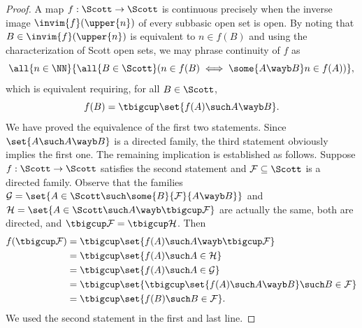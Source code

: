 \begin{proof}
  A map $f : \Scott \to \Scott$ is continuous precisely when the
  inverse image $\invim{f}(\upper{n})$ of every subbasic open set is open.
  By noting that $B \in \invim{f}(\upper{n})$ is equivalent to $n \in
  f(B)$ and using the characterization of Scott open sets, we may
  phrase continuity of $f$ as
  \begin{equation*}
    \all{n \in \NN}{
      \all{B \in \Scott}
        (n \in f(B) \iff \some{A \wayb B} n \in f(A))
    },
  \end{equation*}
  which is equivalent requiring, for all $B \in \Scott$,
  \begin{equation*}
    f(B) = \tbigcup \set{f(A) \such A \wayb B}.
  \end{equation*}
  We have proved the equivalence of the first two statements. Since
  $\set{A \such A \wayb B}$ is a directed family, the third statement
  obviously implies the first one. The remaining implication is
  established as follows. Suppose $f : \Scott \to \Scott$ satisfies
  the second statement and $\mathcal{F} \subseteq \Scott$ is a
  directed family. Observe that the families $\mathcal{G} = \set{A \in
    \Scott \such \some{B}{\mathcal{F}}{A \wayb B}}$ and $\mathcal{H}
  = \set{A \in \Scott \such A \wayb \tbigcup \mathcal{F}}$ are
  actually the same, both are directed, and $\tbigcup \mathcal{F} =
  \tbigcup \mathcal{H}$. Then
  \begin{align*}
    f (\tbigcup \mathcal{F}) &=
    \tbigcup \set{f(A) \such A \wayb \tbigcup \mathcal{F}} \\
    &= \tbigcup \set{f(A) \such A \in \mathcal{H}} \\
    &= \tbigcup \set{f(A) \such A \in \mathcal{G}} \\
    &= \tbigcup \set{\tbigcup \set{f(A) \such A \wayb B} \such B \in \mathcal{F}} \\
    &= \tbigcup \set{f(B) \such B \in \mathcal{F}}.
  \end{align*}
  We used the second statement in the first and last line.
\end{proof}

